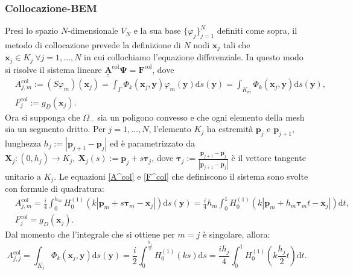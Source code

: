 \subsubsection{Collocazione-BEM}
Presi lo spazio $N$-dimensionale $V_N$ e la sua base $\{\varphi_j\}_{j=1}^N$ definiti come sopra, il metodo di collocazione prevede la definizione di $N$ nodi $\textbf{x}_j$ tali che $\textbf{x}_j \in K_j \ \forall j = 1,\dots,N$ in cui collochiamo l'equazione differenziale. In questo modo si risolve il sistema lineare $\underline{\underline{\textbf{A}}}^{\text{col}} \bm{\Psi} = \textbf{F}^{\text{col}}$, dove
	\begin{align}
		&A_{j,m}^{\text{col}} := (S \varphi_m)(\textbf{x}_j) = \int_\Gamma \Phi_k(\textbf{x}_j,\textbf{y}) \varphi_m(\textbf{y}) \mathrm{d}s(\textbf{y}) = \int_{K_m} \Phi_k(\textbf{x}_j,\textbf{y}) \mathrm{d}s(\textbf{y}), \label{A^col} \\
		&F_j^{\text{col}} := g_D(\textbf{x}_j). \label{F^col}
	\end{align}
Ora si supponga che $\Omega_{-}$ sia un poligono convesso e che ogni elemento della mesh sia un segmento dritto. Per $j=1,\dots,N$, l'elemento $K_j$ ha estremità $\textbf{p}_j$ e $\textbf{p}_{j+1}$, lunghezza $h_j := |\textbf{p}_{j+1}-\textbf{p}_{j}|$ ed è parametrizzato da $\textbf{X}_j:(0,h_j) \rightarrow K_j, \ \textbf{X}_j(s) := \textbf{p}_j + s\bm{\tau}_j$, dove $\bm{\tau}_j := \frac{\textbf{p}_{j+1} - \textbf{p}_j}{|\textbf{p}_{j+1} - \textbf{p}_j|}$ è il vettore tangente unitario a $K_j$.
Le equazioni \eqref{A^col} e \eqref{F^col} che definiscono il sistema sono svolte con formule di quadratura:
\begin{align}
	&A_{j,m}^{\text{col}} = \frac{i}{4} \int_0^{h_m} H^{(1)}_0(k |\textbf{p}_m + s \bm{\tau}_m - \textbf{x}_j|) \mathrm{d}s(\textbf{y}) = \frac{i}{4} h_m \int_0^1 H^{(1)}_0(k |\textbf{p}_m + h_m \bm{\tau}_m t - \textbf{x}_j|) \mathrm{d}t, \\&
	F_j^{\text{col}} = g_D(\textbf{x}_j).
\end{align}
Dal momento che l'integrale che si ottiene per $m=j$ è singolare, allora:
\begin{equation}
	A_{j,j}^{\text{col}} = \int_{K_j} \Phi_k(\textbf{x}_j,\textbf{y}) \mathrm{d}s(\textbf{y}) = \frac{i}{2} \int_0^{\frac{h_j}{2}} H^{(1)}_0(ks) \mathrm{d}s = \frac{i h_j}{4} \int_0^1 H^{(1)}_0 \left( k \frac{h_j}{2} t \right) \mathrm{d}t.
\end{equation}

